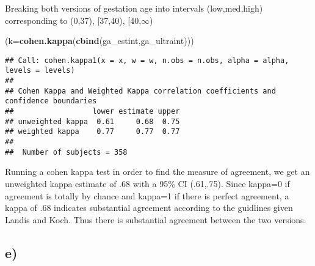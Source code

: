 \documentclass[]{article}
\newenvironment{Shaded}{\begin{snugshade}}{\end{snugshade}}
\newcommand{\KeywordTok}[1]{\textcolor[rgb]{0.13,0.29,0.53}{\textbf{#1}}}
\newcommand{\DataTypeTok}[1]{\textcolor[rgb]{0.13,0.29,0.53}{#1}}
\newcommand{\DecValTok}[1]{\textcolor[rgb]{0.00,0.00,0.81}{#1}}
\newcommand{\OtherTok}[1]{\textcolor[rgb]{0.56,0.35,0.01}{#1}}
\newcommand{\OperatorTok}[1]{\textcolor[rgb]{0.81,0.36,0.00}{\textbf{#1}}}
\newcommand{\NormalTok}[1]{#1}
\begin{document}
Breaking both versions of gestation age into intervals (low,med,high)
corresponding to (0,37), {[}37,40), {[}40,\(\infty\))

\begin{Shaded}
\begin{Highlighting}[]
\NormalTok{(}\DataTypeTok{k=}\KeywordTok{cohen.kappa}\NormalTok{(}\KeywordTok{cbind}\NormalTok{(ga_estint,ga_ultraint)))}
\end{Highlighting}
\end{Shaded}

\begin{verbatim}
## Call: cohen.kappa1(x = x, w = w, n.obs = n.obs, alpha = alpha, levels = levels)
## 
## Cohen Kappa and Weighted Kappa correlation coefficients and confidence boundaries 
##                  lower estimate upper
## unweighted kappa  0.61     0.68  0.75
## weighted kappa    0.77     0.77  0.77
## 
##  Number of subjects = 358
\end{verbatim}

Running a cohen kappa test in order to find the measure of agreement, we
get an unweighted kappa estimate of .68 with a 95\% CI (.61,.75). Since
kappa=0 if agreement is totally by chance and kappa=1 if there is
perfect agreement, a kappa of .68 indicates substantial agreement
according to the guidlines given Landis and Koch. Thus there is
substantial agreement between the two versions.

\subsection{e)}\label{e}

\begin{Shaded}
\end{Shaded}
\end{document}
